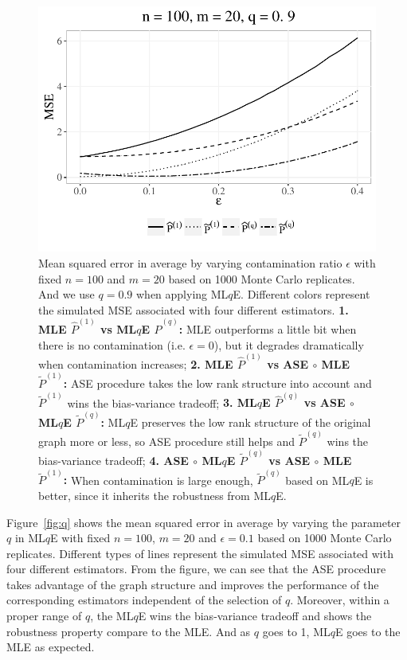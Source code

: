 \documentclass[a4paper]{article}
\renewcommand{\hat}{\widehat}
\begin{document}
\begin{figure}[!htb]
\centering
\includegraphics[width=1\textwidth]{sim_eps.pdf}
\caption{Mean squared error in average by varying contamination ratio $\epsilon$ with fixed $n = 100$ and $m = 20$ based on 1000 Monte Carlo replicates. And we use $q=0.9$ when applying ML$q$E.
Different colors represent the simulated MSE associated with four different estimators.
\textbf{1. MLE $\hat{P}^{(1)}$ vs ML$q$E $\hat{P}^{(q)}$:}
MLE outperforms a little bit when there is no contamination (i.e. $\epsilon = 0$), but it degrades dramatically when contamination increases;
\textbf{2. MLE $\hat{P}^{(1)}$ vs ASE $\circ$ MLE $\widetilde{P}^{(1)}$: }
ASE procedure takes the low rank structure into account and $\widetilde{P}^{(1)}$ wins the bias-variance tradeoff;
\textbf{3. ML$q$E $\hat{P}^{(q)}$ vs ASE $\circ$ ML$q$E $\widetilde{P}^{(q)}$: }
ML$q$E preserves the low rank structure of the original graph more or less, so ASE procedure still helps and $\widetilde{P}^{(q)}$ wins the bias-variance tradeoff;
\textbf{4. ASE $\circ$ ML$q$E $\widetilde{P}^{(q)}$ vs ASE $\circ$ MLE $\widetilde{P}^{(1)}$: }
When contamination is large enough, $\widetilde{P}^{(q)}$ based on ML$q$E is better, since it inherits the robustness from ML$q$E.}
\label{fig:eps}
\end{figure}

Figure~\ref{fig:q} shows the mean squared error in average by varying the parameter $q$ in ML$q$E with fixed $n = 100$, $m = 20$ and $\epsilon = 0.1$ based on 1000 Monte Carlo replicates. Different types of lines represent the simulated MSE associated with four different estimators. From the figure, we can see that the ASE procedure takes advantage of the graph structure and improves the performance of the corresponding estimators independent of the selection of $q$. Moreover, within a proper range of $q$, the ML$q$E wins the bias-variance tradeoff and shows the robustness property compare to the MLE. And as $q$ goes to 1, ML$q$E goes to the MLE as expected.
\end{document}
